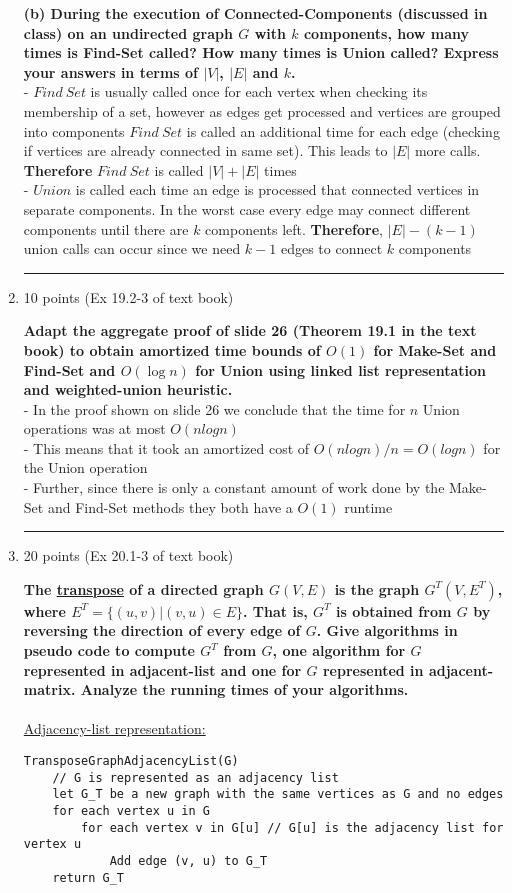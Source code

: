 \documentclass[letterpaper,12pt]{article}
\begin{document}
\begin{enumerate}
\textbf{(b) During the execution of Connected-Components (discussed in class) on an undirected 
graph $G$ with $k$ components, how many times is Find-Set called? How many times is Union 
called? Express your answers in terms of $|V|$, $|E|$ and $k$.} \\
- $Find \ Set$ is usually called once for each vertex when checking its membership of a set, however as edges get processed and vertices are grouped into components $Find \ Set$ is called an additional time for each edge (checking if vertices are already connected in same set). This leads to $|E|$ more calls. \textbf{Therefore} $Find \ Set$ is called $|V|+|E|$ times \\
- $Union$ is called each time an edge is processed that connected vertices in separate components. In the worst case every edge may connect different components until there are $k$ components left. \textbf{Therefore}, $|E|-(k-1)$ union calls can occur since we need $k-1$ edges to connect $k$ components \\

\noindent\rule{16cm}{0.1pt}
\item 10 points (Ex 19.2-3 of text book)

\textbf{Adapt the aggregate proof of slide 26 (Theorem 19.1 in the text book) to obtain amortized 
time bounds of $O(1)$ for Make-Set and Find-Set and $O(\log n)$ for Union using linked
list representation and weighted-union heuristic.} \\
- In the proof shown on slide 26 we conclude that the time for $n$ Union operations was at most $O(nlogn)$ \\
- This means that it took an amortized cost of $O(nlogn)/n = O(logn)$ for the Union operation \\
- Further, since there is only a constant amount of work done by the Make-Set and Find-Set methods they both have a $O(1)$ runtime \\

\noindent\rule{16cm}{0.1pt}
\item 20 points (Ex 20.1-3 of text book) 

\textbf{The \underline{transpose} of a directed graph $G(V,E)$ is the graph $G^T(V,E^T)$,
where $E^T=\{(u,v)|(v,u)\in E\}$. That is, $G^T$ is obtained from $G$ by
reversing the direction of every edge of $G$. Give algorithms in pseudo
code to compute $G^T$ from $G$, one algorithm for $G$ represented in adjacent-list
and one for $G$ represented in adjacent-matrix.
Analyze the running times of your algorithms.} \\ \\
\underline{Adjacency-list representation:}
\begin{verbatim}
TransposeGraphAdjacencyList(G)
    // G is represented as an adjacency list
    let G_T be a new graph with the same vertices as G and no edges
    for each vertex u in G
        for each vertex v in G[u] // G[u] is the adjacency list for vertex u
            Add edge (v, u) to G_T
    return G_T


\end{verbatim}
\end{enumerate}
\end{document}
